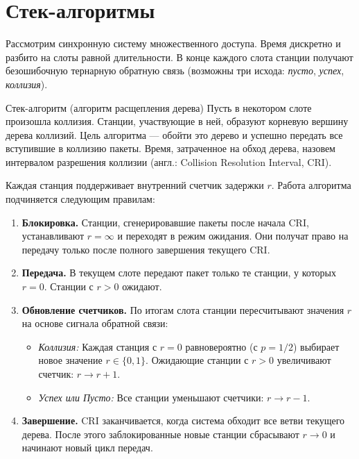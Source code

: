 \section{Стек-алгоритмы}

Рассмотрим синхронную систему множественного доступа. Время дискретно и разбито на слоты равной длительности. В конце каждого слота станции получают безошибочную тернарную обратную связь (возможны три исхода: \textit{пусто}, \textit{успех}, \textit{коллизия}). 

\begin{definition}{Стек-алгоритм (алгоритм расщепления дерева)}
    Пусть в некотором слоте произошла коллизия. Станции, участвующие в ней, образуют корневую вершину дерева коллизий. Цель алгоритма — обойти это дерево и успешно передать все вступившие в коллизию пакеты. Время, затраченное на обход дерева, назовем интервалом разрешения коллизии (англ.: Collision Resolution Interval, CRI).
    
    Каждая станция поддерживает внутренний счетчик задержки $r$. Работа алгоритма подчиняется следующим правилам:
    \begin{enumerate}
        \item \textbf{Блокировка.} Станции, сгенерировавшие пакеты после начала CRI, устанавливают $r = \infty$ и переходят в режим ожидания. Они получат право на передачу только после полного завершения текущего CRI.
        \item \textbf{Передача.} В текущем слоте передают пакет только те станции, у которых $r = 0$. Станции с $r > 0$ ожидают.
        \item \textbf{Обновление счетчиков.} По итогам слота станции пересчитывают значения $r$ на основе сигнала обратной связи:
        \begin{itemize}
            \item \textit{Коллизия:} Каждая станция с $r=0$ равновероятно (с $p=1/2$) выбирает новое значение $r \in \{0, 1\}$. Ожидающие станции с $r > 0$ увеличивают счетчик: $r \to r + 1$.
            \item \textit{Успех или Пусто:} Все станции уменьшают счетчики: $r \to r - 1$.
        \end{itemize}
        \item \textbf{Завершение.} CRI заканчивается, когда система обходит все ветви текущего дерева. После этого заблокированные новые станции сбрасывают $r \to 0$ и начинают новый цикл передач.
    \end{enumerate}
\end{definition}


